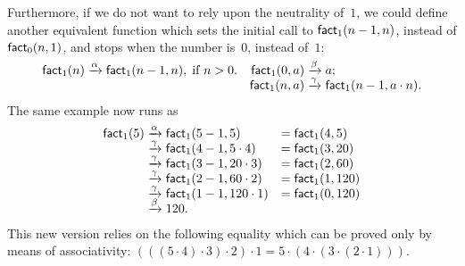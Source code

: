 Furthermore, if we do not want to rely upon the neutrality of~\(1\),
we could define another equivalent function  which
sets the initial call to \(\textsf{fact}_1(n-1,n)\), instead of
\(\textsf{fact}_0(n,1)\), and stops when the number is~\(0\), instead
of~\(1\):
\begin{equation*}
\begin{array}{@{}r@{\;}l@{\;}lr@{\;}l@{\;}l@{}}
\fun{fact}_1(n) & \xrightarrow{\smash[t]{\alpha}} &
\fun{fact}_1(n-1,n),\;\text{if \(n > 0\)}.
& \fun{fact}_1(0,a) & \xrightarrow{\smash[t]{\beta}} & a;\\
&&& \fun{fact}_1(n,a) & \xrightarrow{\smash[t]{\gamma}} &
\fun{fact}_1(n-1,a \cdot n).
\end{array}
\end{equation*}
The same example now runs as
\begin{equation*}
\begin{array}{r@{\;}c@{\;}lc@{\;}l}
\fun{fact}_1(5)
& \xrightarrow{\smash[t]{\alpha}} & \fun{fact}_1(5-1,5)
& = & \fun{fact}_1(4,5)\\
& \xrightarrow{\smash[t]{\gamma}} & \fun{fact}_1(4-1,5 \cdot 4)
& = & \fun{fact}_1(3,20)\\
& \xrightarrow{\smash[t]{\gamma}} & \fun{fact}_1(3-1,20 \cdot 3)
& = & \fun{fact}_1(2,60)\\
& \xrightarrow{\smash[t]{\gamma}} & \fun{fact}_1(2-1,60 \cdot 2)
& = & \fun{fact}_1(1,120)\\
& \xrightarrow{\smash[t]{\gamma}} & \fun{fact}_1(1-1,120 \cdot 1)
& = & \fun{fact}_1(0,120)\\
& \xrightarrow{\smash[t]{\beta}} & 120.
\end{array}
\end{equation*}
This new version relies on the following equality which can be proved
only by means of associativity: \((((5 \cdot 4) \cdot 3) \cdot 2)
\cdot 1 = 5 \cdot (4 \cdot (3 \cdot (2 \cdot 1)))\).

